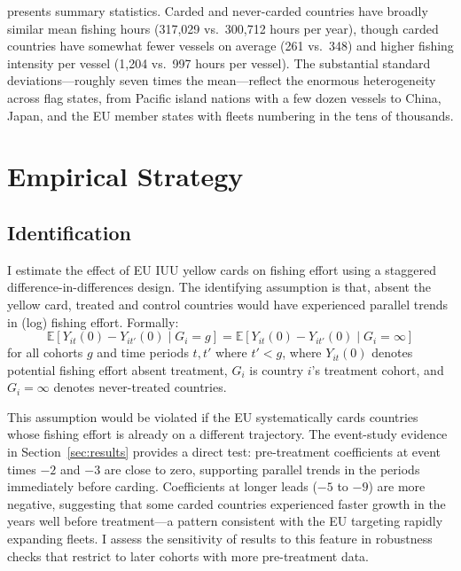 \documentclass[12pt]{article}
\newcommand{\E}{\mathbb{E}}
\begin{document}
 presents summary statistics. Carded and never-carded countries have broadly similar mean fishing hours (317,029 vs.\ 300,712 hours per year), though carded countries have somewhat fewer vessels on average (261 vs.\ 348) and higher fishing intensity per vessel (1,204 vs.\ 997 hours per vessel). The substantial standard deviations---roughly seven times the mean---reflect the enormous heterogeneity across flag states, from Pacific island nations with a few dozen vessels to China, Japan, and the EU member states with fleets numbering in the tens of thousands.






\section{Empirical Strategy}
\label{sec:strategy}

\subsection{Identification}

I estimate the effect of EU IUU yellow cards on fishing effort using a staggered difference-in-differences design. The identifying assumption is that, absent the yellow card, treated and control countries would have experienced parallel trends in (log) fishing effort. Formally:
\begin{equation}
\E[Y_{it}(0) - Y_{it'}(0) \mid G_i = g] = \E[Y_{it}(0) - Y_{it'}(0) \mid G_i = \infty]
\label{eq:parallel}
\end{equation}
for all cohorts $g$ and time periods $t, t'$ where $t' < g$, where $Y_{it}(0)$ denotes potential fishing effort absent treatment, $G_i$ is country $i$'s treatment cohort, and $G_i = \infty$ denotes never-treated countries.

This assumption would be violated if the EU systematically cards countries whose fishing effort is already on a different trajectory. The event-study evidence in Section~\ref{sec:results} provides a direct test: pre-treatment coefficients at event times $-2$ and $-3$ are close to zero, supporting parallel trends in the periods immediately before carding. Coefficients at longer leads ($-5$ to $-9$) are more negative, suggesting that some carded countries experienced faster growth in the years well before treatment---a pattern consistent with the EU targeting rapidly expanding fleets. I assess the sensitivity of results to this feature in robustness checks that restrict to later cohorts with more pre-treatment data.
\end{document}
